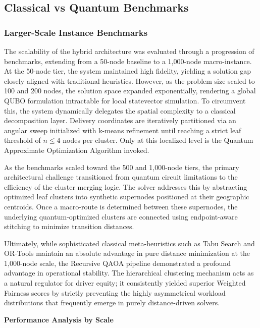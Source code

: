 \documentclass[a4paper]{report}
\begin{document}
{\begin{itemize}
\begin{itemize}
\subsection{Classical vs Quantum Benchmarks}

\subsubsection{Larger-Scale Instance Benchmarks}

The scalability of the hybrid architecture was evaluated through a progression of benchmarks, extending from a 50-node baseline to a 1,000-node macro-instance. At the 50-node tier, the system maintained high fidelity, yielding a solution gap closely aligned with traditional heuristics. However, as the problem size scaled to 100 and 200 nodes, the solution space expanded exponentially, rendering a global QUBO formulation intractable for local statevector simulation. To circumvent this, the system dynamically delegates the spatial complexity to a classical decomposition layer. Delivery coordinates are iteratively partitioned via an angular sweep initialized with k-means refinement until reaching a strict leaf threshold of $n \le 4$ nodes per cluster. Only at this localized level is the Quantum Approximate Optimization Algorithm invoked.

As the benchmarks scaled toward the 500 and 1,000-node tiers, the primary architectural challenge transitioned from quantum circuit limitations to the efficiency of the cluster merging logic. The solver addresses this by abstracting optimized leaf clusters into synthetic supernodes positioned at their geographic centroids. Once a macro-route is determined between these supernodes, the underlying quantum-optimized clusters are connected using endpoint-aware stitching to minimize transition distances. 

Ultimately, while sophisticated classical meta-heuristics such as Tabu Search and OR-Tools maintain an absolute advantage in pure distance minimization at the 1,000-node scale, the Recursive QAOA pipeline demonstrated a profound advantage in operational stability. The hierarchical clustering mechanism acts as a natural regulator for driver equity; it consistently yielded superior Weighted Fairness scores by strictly preventing the highly asymmetrical workload distributions that frequently emerge in purely distance-driven solvers.

\vspace{1em}
\noindent\textbf{Performance Analysis by Scale}


\end{itemize}
\end{itemize}}
\end{document}
